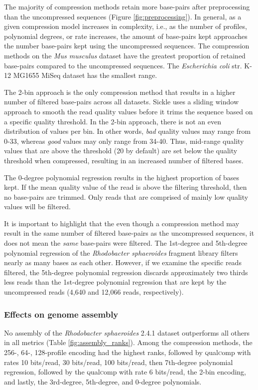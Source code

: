 The majority of compression methods retain more base-pairs after
preprocessing than the uncompressed sequences (Figure
\ref{fig:preprocessing}). In general, as a given compression model
increases in complexity, i.e., as the number of profiles, polynomial
degrees, or rate increases, the amount of base-pairs kept approaches
the number base-pairs kept using the uncompressed sequences. The
compression methods on the \textit{Mus musculus} dataset have the
greatest proportion of retained base-pairs compared to the
uncompressed sequences. The \textit{Escherichia coli} str. K-12
MG1655 MiSeq dataset has the smallest range.

The 2-bin approach is the only compression method that results in a
higher number of filtered base-pairs across all datasets. Sickle
uses a sliding window approach to smooth the read quality values before
it trims the sequence based on a specific quality threshold. In the
2-bin approach, there is not an even distribution of values per bin.
In other words, \emph{bad} quality values may range from 0-33, whereas
\emph{good} values may only range from 34-40. Thus, mid-range quality
values that are above the threshold (20 by default) are set below the
quality threshold when compressed, resulting in an increased number of
filtered bases.

The 0-degree polynomial regression results in the highest proportion
of bases kept. If the mean quality value of the read is above
the filtering threshold, then no base-pairs are trimmed. Only
reads that are comprised of mainly low quality values will be
filtered.

It is important to highlight that the even though a compression method
may result in the same number of filtered base-pairs as the
uncompressed sequences, it does not mean the \emph{same} base-pairs
were filtered. The 1st-degree and 5th-degree polynomial regression of
the \textit{Rhodobacter sphaeroides} fragment library filters nearly
as many bases as each other. However, if we examine the specific
reads filtered, the 5th-degree polynomial regression discards
approximately two thirds less reads than the 1st-degree polynomial
regression that are kept by the uncompressed reads (4,640 and
12,066 reads, respectively).

\subsubsection{Effects on genome assembly}

No assembly of the \textit{Rhodobacter sphaeroides} 2.4.1 dataset
outperforms all others in all metrics (Table
\ref{fig:assembly_ranks}).
Among the compression methods, the 256-, 64-, 128-profile encoding had
the highest ranks, followed by \textsc{q}ual\textsc{c}omp with rates 10 bits/read, 30
bits/read, 100 bits/read, then 7th-degree polynomial regression,
followed by the \textsc{q}ual\textsc{c}omp with rate 6 bits/read, the 2-bin encoding,
and lastly, the 3rd-degree, 5th-degree, and 0-degree polynomials.

